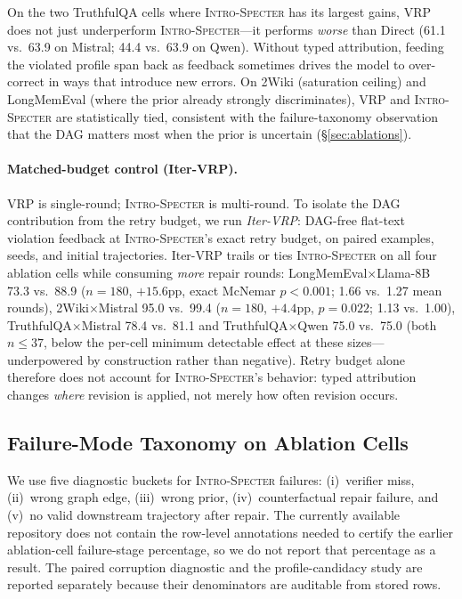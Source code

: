 \documentclass{article}
\newcommand{\method}{\textsc{Intro-Specter}\xspace}
\begin{document}
On the two TruthfulQA cells where \method has its largest gains, VRP does not just underperform \method---it performs \emph{worse} than Direct (61.1 vs.\ 63.9 on Mistral; 44.4 vs.\ 63.9 on Qwen). Without typed attribution, feeding the violated profile span back as feedback sometimes drives the model to over-correct in ways that introduce new errors. On 2Wiki (saturation ceiling) and LongMemEval (where the prior already strongly discriminates), VRP and \method are statistically tied, consistent with the failure-taxonomy observation that the DAG matters most when the prior is uncertain (\S\ref{sec:ablations}).

\paragraph{Matched-budget control (Iter-VRP).} VRP is single-round; \method is multi-round. To isolate the DAG contribution from the retry budget, we run \emph{Iter-VRP}: DAG-free flat-text violation feedback at \method's exact retry budget, on paired examples, seeds, and initial trajectories. Iter-VRP trails or ties \method on all four ablation cells while consuming \emph{more} repair rounds: LongMemEval$\times$Llama-8B 73.3 vs.\ 88.9 ($n{=}180$, $+15.6$pp, exact McNemar $p{<}0.001$; 1.66 vs.\ 1.27 mean rounds), 2Wiki$\times$Mistral 95.0 vs.\ 99.4 ($n{=}180$, $+4.4$pp, $p{=}0.022$; 1.13 vs.\ 1.00), TruthfulQA$\times$Mistral 78.4 vs.\ 81.1 and TruthfulQA$\times$Qwen 75.0 vs.\ 75.0 (both $n{\le}37$, below the per-cell minimum detectable effect at these sizes---underpowered by construction rather than negative). Retry budget alone therefore does not account for \method's behavior: typed attribution changes \emph{where} revision is applied, not merely how often revision occurs.

\subsection{Failure-Mode Taxonomy on Ablation Cells}\label{sec:failure-taxonomy}

We use five diagnostic buckets for \method failures: (i)~verifier miss, (ii)~wrong graph edge, (iii)~wrong prior, (iv)~counterfactual repair failure, and (v)~no valid downstream trajectory after repair. The currently available repository does not contain the row-level annotations needed to certify the earlier ablation-cell failure-stage percentage, so we do not report that percentage as a result. The paired corruption diagnostic and the profile-candidacy study are reported separately because their denominators are auditable from stored rows.
\end{document}
